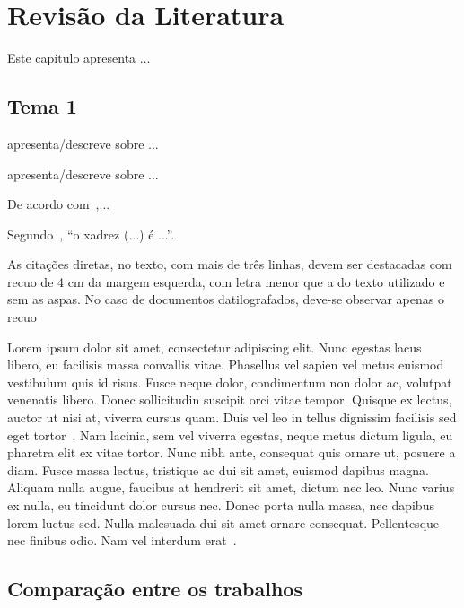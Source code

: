 \documentclass[12pt,oneside,a4paper,chapter=TITLE,section=TITLE,sumario
=tradicional]{abntex2}
\begin{document}
\chapter{Revisão da Literatura}
\label{cap:revisao}

Este capítulo apresenta ...

\section{Tema 1}


 apresenta/descreve sobre ...


 apresenta/descreve sobre ... 

De acordo com~,...


Segundo~, ``o xadrez (...) é ...''.

\begin{citacao}
As citações diretas, no texto, com mais de três linhas, devem ser
destacadas com recuo de 4 cm da margem esquerda, com letra menor que
a do texto utilizado e sem as aspas. No caso de documentos datilografados,
deve-se observar apenas o recuo \cite[5.3]{autor1}    
\end{citacao}


 Lorem ipsum dolor sit amet, consectetur adipiscing elit. Nunc egestas lacus libero, eu facilisis massa convallis vitae. Phasellus vel sapien vel metus euismod vestibulum quis id risus. Fusce neque dolor, condimentum non dolor ac, volutpat venenatis libero. Donec sollicitudin suscipit orci vitae tempor. Quisque ex lectus, auctor ut nisi at, viverra cursus quam. Duis vel leo in tellus dignissim facilisis sed eget tortor~\cite{autor1}. Nam lacinia, sem vel viverra egestas, neque metus dictum ligula, eu pharetra elit ex vitae tortor. Nunc nibh ante, consequat quis ornare ut, posuere a diam. Fusce massa lectus, tristique ac dui sit amet, euismod dapibus magna. Aliquam nulla augue, faucibus at hendrerit sit amet, dictum nec leo. Nunc varius ex nulla, eu tincidunt dolor cursus nec. Donec porta nulla massa, nec dapibus lorem luctus sed. Nulla malesuada dui sit amet ornare consequat. Pellentesque nec finibus odio. Nam vel interdum erat~\cite{autor1, autor2, autor3}. 

\section{Comparação entre os trabalhos}
\end{document}
